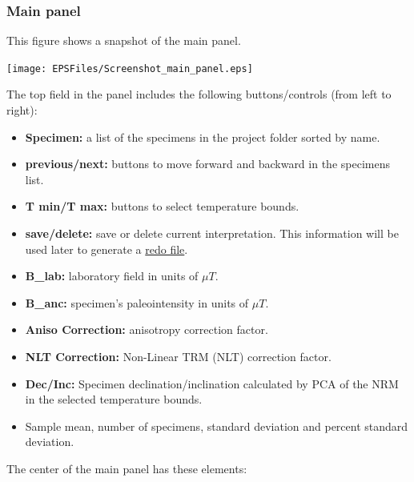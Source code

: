 \documentclass[11pt]{book}
\begin{document}
{{\subsubsection{Main panel}

This figure shows a snapshot of the main panel.

  \texttt{[image: EPSFiles/Screenshot\_main\_panel.eps]}

\noindent
  The top field in the  panel includes the following buttons/controls (from left to right):
  \begin{itemize}
\item {\bf Specimen:} a list of the specimens in the project folder sorted by name.
\item {\bf previous/next:} buttons to move forward and backward in the specimens list.
\item {\bf T min/T max:} buttons to select temperature bounds.
\item {\bf save/delete:} save or delete current interpretation. This information will be used later to generate a \href{#mk_redo.py}{redo file}.
\item {\bf B\_lab:} laboratory field in units of $\mu T$.
\item {\bf B\_anc:} specimen's paleointensity in units of $\mu T$.
\item {\bf Aniso Correction:} anisotropy correction factor.
\item {\bf NLT Correction:} Non-Linear TRM (NLT) correction factor.
\item {\bf Dec/Inc:} Specimen declination/inclination calculated by PCA of the NRM in the selected temperature bounds.
\item Sample mean, number of specimens, standard deviation and percent standard deviation.
\end{itemize}

The center of the main panel has these elements:

}}
\end{document}
